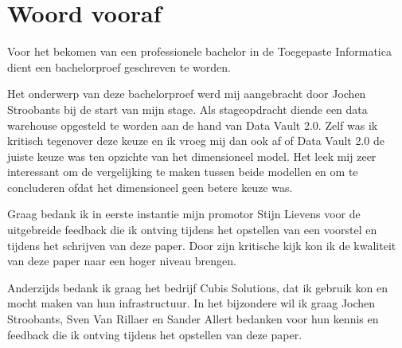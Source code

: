 
\chapter*{Woord vooraf}
\label{ch:voorwoord}


Voor het bekomen van een professionele bachelor in de Toegepaste Informatica dient een bachelorproef geschreven te worden. 

Het onderwerp van deze bachelorproef werd mij aangebracht door Jochen Stroobants bij de start van mijn stage. Als stageopdracht diende een data warehouse opgesteld te worden aan de hand van Data Vault 2.0. Zelf was ik kritisch tegenover deze keuze en ik vroeg mij dan ook af of Data Vault 2.0 de juiste keuze was ten opzichte van het dimensioneel model. Het leek mij zeer interessant om de vergelijking te maken tussen beide modellen en om te concluderen ofdat het dimensioneel geen betere keuze was.

Graag bedank ik in eerste instantie mijn promotor Stijn Lievens voor de uitgebreide feedback die ik ontving tijdens het opstellen van een voorstel en tijdens het schrijven van deze paper. Door zijn kritische kijk kon ik de kwaliteit van deze paper naar een hoger niveau brengen. 

Anderzijds bedank ik graag het bedrijf Cubis Solutions, dat ik gebruik kon en mocht maken van hun infrastructuur. In het bijzondere wil ik graag Jochen Stroobants, Sven Van Rillaer en Sander Allert bedanken voor hun kennis en feedback die ik ontving tijdens het opstellen van deze paper.